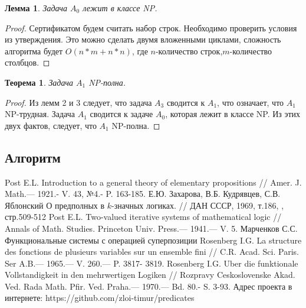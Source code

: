 \documentclass[a4paper,14pt]{extreport}
\newtheorem{thm}{Теорема}
\newtheorem{lm}{Лемма}
\begin{document}
\begin{lm}
Задача $A_0$ лежит в классе NP.
\end{lm}
\begin{proof}
Сертификатом будем считать набор строк. Необходимо проверить условия из утверждения. Это можно сделать двумя вложенными циклами, сложность алгоритма будет $O(n*m+n*n)$, где $n$-количество строк,$m$-количество столбцов.
\end{proof}

\begin{thm}
Задача $A_1$ NP-полна.
\end{thm}
\begin{proof}
Из лемм 2 и 3 следует, что задача $A_3$ сводится к $A_1$, что означает, что $A_1$ NP-трудная. Задача $A_1$ сводится к задаче $A_0$, которая лежит в классе NP. Из этих двух фактов, следует, что $A_1$ NP-полна.  
\end{proof}
\subsection{Алгоритм}



  

\newpage
{}
\begin{thebibliography}{9}
	Post E.L. Introduction to a general theory of elementary propositions // 
Amer. J. Math.— 1921.- V. 43, №4.- P. 163-185. 
 Е.Ю. Захарова, В.Б. Кудрявцев, С.В. Яблонский О предполных в $k$-значных логиках. // ДАН СССР, 1969, т.186, , стр.509-512 
	Post E.L. Two-valued iterative systems of mathematical logic // Annals of 
Math. Studies. Princeton Univ. Press.— 1941.— V. 5. 
 Марченков С.С. Функциональные системы с операцией суперпозиции
	Rosenberg I.G. La structure des fonctions de plusieurs variables sur un ensemble fini // C.R. Acad. Sci. Paris. Ser A.B.— 1965.— V. 260.— P. 3817- 3819. 
	Rosenberg I.G. Uber die funktionale Vollstandigkeit in den mehrwertigen Logiken // Rozpravy Ceskoslovenske Akad. Ved. Rada Math. Pfir. Ved. Praha.— 1970.— Bd. 80.- S. 3-93. 
 Адрес проекта в интернете: https://github.com/zloi-timur/predicates 


\end{thebibliography}
\end{document}
